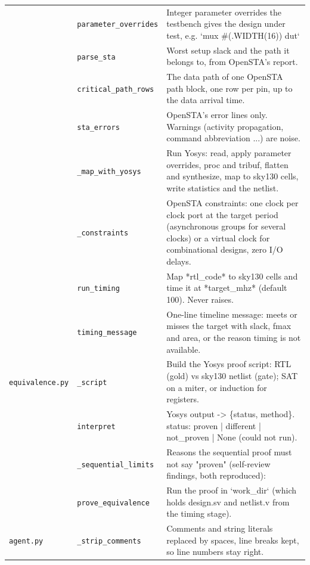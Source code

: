 \begin{longtable}{@{}p{2.8cm}>{\raggedright\arraybackslash}p{4.6cm}p{7.9cm}@{}}
{\small } & \texttt{\small parameter\_\allowbreak{}overrides} & Integer parameter overrides the testbench gives the design under test, e.g. `mux \#(.WIDTH(16)) dut` \\
{\small } & \texttt{\small parse\_\allowbreak{}sta} & Worst setup slack and the path it belongs to, from OpenSTA's report. \\
{\small } & \texttt{\small critical\_\allowbreak{}path\_\allowbreak{}rows} & The data path of one OpenSTA path block, one row per pin, up to the data arrival time. \\
{\small } & \texttt{\small sta\_\allowbreak{}errors} & OpenSTA's error lines only. Warnings (activity propagation, command abbreviation ...) are noise. \\
{\small } & \texttt{\small \_\allowbreak{}map\_\allowbreak{}with\_\allowbreak{}yosys} & Run Yosys: read, apply parameter overrides, proc and tribuf, flatten and synthesize, map to sky130 cells, write statistics and the netlist. \\
{\small } & \texttt{\small \_\allowbreak{}constraints} & OpenSTA constraints: one clock per clock port at the target period (asynchronous groups for several clocks) or a virtual clock for combinational designs, zero I/O delays. \\
{\small } & \texttt{\small run\_\allowbreak{}timing} & Map *rtl\_code* to sky130 cells and time it at *target\_mhz* (default 100). Never raises. \\
{\small } & \texttt{\small timing\_\allowbreak{}message} & One-line timeline message: meets or misses the target with slack, fmax and area, or the reason timing is not available. \\
{\small \nolinkurl{equivalence.py}} & \texttt{\small \_\allowbreak{}script} & Build the Yosys proof script: RTL (gold) vs sky130 netlist (gate); SAT on a miter, or induction for registers. \\
{\small } & \texttt{\small interpret} & Yosys output -\textgreater{} \{status, method\}. status: proven | different | not\_proven | None (could not run). \\
{\small } & \texttt{\small \_\allowbreak{}sequential\_\allowbreak{}limits} & Reasons the sequential proof must not say "proven" (self-review findings, both reproduced): \\
{\small } & \texttt{\small prove\_\allowbreak{}equivalence} & Run the proof in `work\_dir` (which holds design.sv and netlist.v from the timing stage). \\
{\small \nolinkurl{agent.py}} & \texttt{\small \_\allowbreak{}strip\_\allowbreak{}comments} & Comments and string literals replaced by spaces, line breaks kept, so line numbers stay right. \\

\end{longtable}

